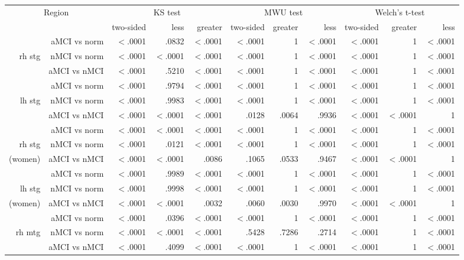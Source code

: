 \documentclass[12pt]{article}\usepackage[]{graphicx}\usepackage[]{color}
\newcommand\T{\rule{0pt}{2.6ex}}
\newcommand\B{\rule[-1.2ex]{0pt}{0pt}}
\begin{document}
\newpage
\begin{sidewaystable}
	\centering
	\footnotesize
	\begin{tabular}{rr|rrr|rrr|rrr}
		\hline
		\multicolumn{2}{c|}{Region} \T\B & \multicolumn{3}{c|}{KS test} & \multicolumn{3}{c|}{MWU test} & \multicolumn{3}{c}{Welch's t-test} \\
		& & two-sided & less & greater & two-sided & greater & less & two-sided & greater & less \\ \hline
		& aMCI vs norm\T & $<$.0001 & .0832 & $<$.0001 & $<$.0001 & 1 & $<$.0001 & $<$.0001 & 1 & $<$.0001 \\
		rh stg & nMCI vs norm & $<$.0001 & $<$.0001 & $<$.0001 & $<$.0001 & 1 & $<$.0001 & $<$.0001 & 1 & $<$.0001 \\
		& aMCI vs nMCI\T & $<$.0001 & .5210 & $<$.0001 & $<$.0001 & 1 & $<$.0001 & $<$.0001 & 1 & $<$.0001 \\ \hline
		& aMCI vs norm & $<$.0001 & .9794 & $<$.0001 & $<$.0001 & 1 & $<$.0001 & $<$.0001 & 1 & $<$.0001 \\
		lh stg & nMCI vs norm & $<$.0001 & .9983 & $<$.0001 & $<$.0001 & 1 & $<$.0001 & $<$.0001 & 1 & $<$.0001 \\
		& aMCI vs nMCI & $<$.0001 & $<$.0001 & $<$.0001 & .0128 & .0064  & .9936 & $<$.0001 & $<$.0001 & 1 \\ \hline
		& aMCI vs norm\T & $<$.0001 & $<$.0001 & $<$.0001 & $<$.0001 & 1 & $<$.0001 & $<$.0001 & 1 & $<$.0001 \\
		rh stg & nMCI vs norm & $<$.0001 & .0121 & $<$.0001 & $<$.0001 & 1 & $<$.0001 & $<$.0001 & 1 & $<$.0001 \\
		(women)& aMCI vs nMCI & $<$.0001 & $<$.0001 & .0086 & .1065 & .0533 & .9467 & $<$.0001 & $<$.0001 & 1 \\ \hline
		& aMCI vs norm\T & $<$.0001 & .9989 & $<$.0001 & $<$.0001 & 1 & $<$.0001 & $<$.0001 & 1 & $<$.0001 \\
		lh stg & nMCI vs norm & $<$.0001 & .9998 & $<$.0001 & $<$.0001 & 1 & $<$.0001 & $<$.0001 & 1 & $<$.0001 \\
		(women)& aMCI vs nMCI & $<$.0001 & $<$.0001 & .0032 & .0060 & .0030 & .9970 & $<$.0001 & $<$.0001 & 1 \\ \hline
		& aMCI vs norm\T & $<$.0001 & .0396 & $<$.0001 & $<$.0001 & 1 & $<$.0001 & $<$.0001 & 1 & $<$.0001 \\
		rh mtg & nMCI vs norm & $<$.0001 & $<$.0001 & $<$.0001 & .5428 & .7286 & .2714 & $<$.0001 & 1 & $<$.0001 \\
		& aMCI vs nMCI & $<$.0001 & .4099 & $<$.0001 & $<$.0001 & 1 & $<$.0001 & $<$.0001 & 1 & $<$.0001 \\ \hline

\end{tabular}
\end{sidewaystable}
\end{document}
